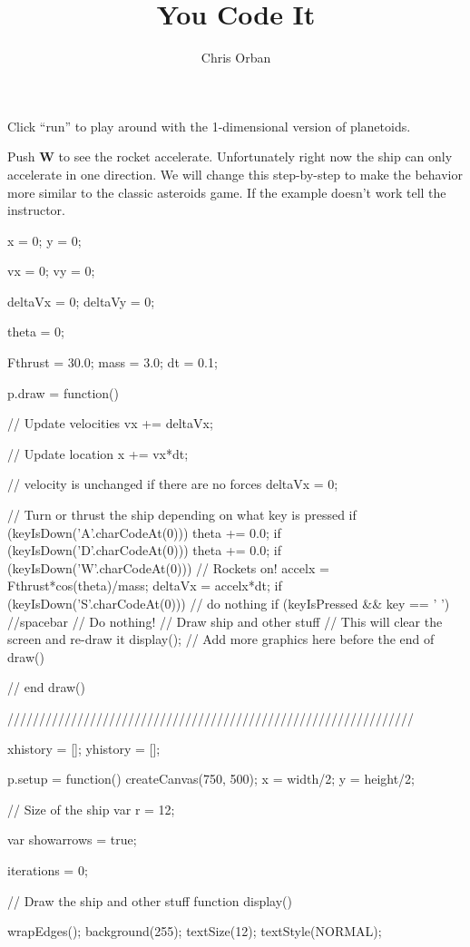 \documentclass{ximera}
\author{Chris Orban}
\title{You Code It}
\begin{document}
\maketitle

Click ``run'' to play around with the 1-dimensional version of planetoids.

Push \textbf{W} to see the rocket accelerate. Unfortunately right now
the ship can only accelerate in one direction. We will change this
step-by-step to make the behavior more similar to the classic
asteroids game. If the example doesn't work tell the instructor.

\begin{javascriptCode}
x = 0;
y = 0;

vx = 0;
vy = 0;

deltaVx = 0;
deltaVy = 0;

theta = 0;

Fthrust = 30.0;
mass = 3.0;
dt = 0.1;

p.draw = function() {
    // Update velocities
    vx += deltaVx;

    // Update location
    x += vx*dt;

    // velocity is unchanged if there are no forces
    deltaVx = 0;

    // Turn or thrust the ship depending on what key is pressed
    if (keyIsDown('A'.charCodeAt(0))) {
        theta += 0.0;
    }
    if (keyIsDown('D'.charCodeAt(0))) {
        theta += 0.0;
    }
    if (keyIsDown('W'.charCodeAt(0))) {
        // Rockets on!
        accelx = Fthrust*cos(theta)/mass;
        deltaVx = accelx*dt;
    }
    if (keyIsDown('S'.charCodeAt(0))) {
            // do nothing
    }
    if (keyIsPressed && key == ' '){ //spacebar
        // Do nothing!
    }
    // Draw ship and other stuff
    // This will clear the screen and re-draw it
    display();
    // Add more graphics here before the end of draw()
  
} // end draw()

////////////////////////////////////////////////////////////////

xhistory = [];
yhistory = [];

p.setup = function() {
    createCanvas(750, 500);
    x = width/2;
    y = height/2;
}

// Size of the ship
var r = 12;

var showarrows = true;

iterations = 0;

// Draw the ship and other stuff
function display() {
    wrapEdges();
    background(255);
    textSize(12);
    textStyle(NORMAL);

}
\end{javascriptCode}
\end{document}
